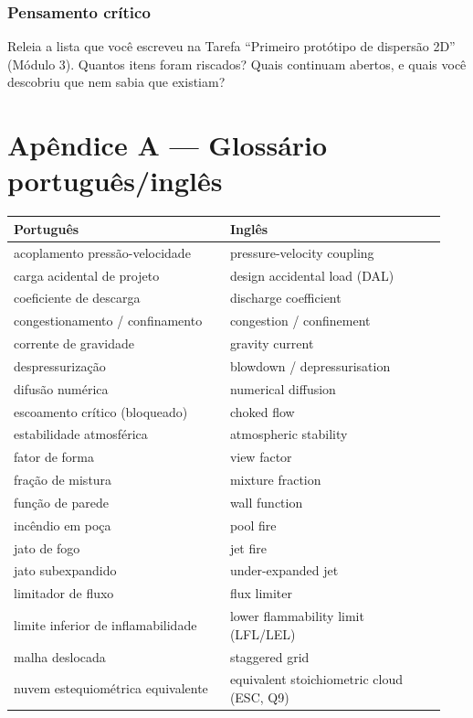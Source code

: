 \documentclass[10pt,a4paper,twocolumn,openany]{report}
\newenvironment{critico}{\subsection*{\textcolor{roxo}{Pensamento crítico}}}{\par}
\begin{document}
\begin{critico}
Releia a lista que você escreveu na Tarefa ``Primeiro protótipo de dispersão
2D'' (Módulo 3). Quantos itens foram riscados? Quais continuam abertos, e
quais você descobriu que nem sabia que existiam?
\end{critico}

\appendix
\chapter*{Apêndice A --- Glossário português/inglês}

\begin{center}
\small
\begin{tabular}{@{}p{0.47\linewidth}p{0.47\linewidth}@{}}
\toprule
Português & Inglês\\
\midrule
acoplamento pressão-velocidade & pressure-velocity coupling\\
carga acidental de projeto & design accidental load (DAL)\\
coeficiente de descarga & discharge coefficient\\
congestionamento / confinamento & congestion / confinement\\
corrente de gravidade & gravity current\\
despressurização & blowdown / depressurisation\\
difusão numérica & numerical diffusion\\
escoamento crítico (bloqueado) & choked flow\\
estabilidade atmosférica & atmospheric stability\\
fator de forma & view factor\\
fração de mistura & mixture fraction\\
função de parede & wall function\\
incêndio em poça & pool fire\\
jato de fogo & jet fire\\
jato subexpandido & under-expanded jet\\
limitador de fluxo & flux limiter\\
limite inferior de inflamabilidade & lower flammability limit (LFL/LEL)\\
malha deslocada & staggered grid\\
nuvem estequiométrica equivalente & equivalent stoichiometric cloud (ESC, Q9)\\

\end{tabular}
\end{center}
\end{document}
